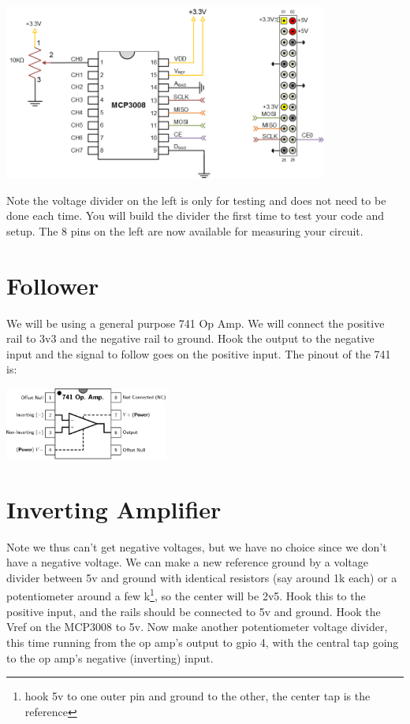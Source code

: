 \includegraphics[width=0.8\textwidth]{../images/mcp3008_circuit.png}

Note the voltage divider on the left is only for testing and does not need to be done each time.  You will build the divider the first time to test your code and setup.  The 8 pins on the left are now available for measuring your circuit.

\section{Follower}

We will be using a general purpose 741 Op Amp.  We will connect the positive rail to 3v3 and the negative rail to ground.  Hook the output to the negative input and the signal to follow goes on the positive input.  The pinout of the 741 is:

\includegraphics[width=0.4\textwidth]{../images/300px-Generic_741_pinout_top.png}


\section{Inverting Amplifier}

Note we thus can't get negative voltages, but we have no choice since we don't have a negative voltage.  We can make a new reference ground by a voltage divider between 5v and ground with identical resistors (say around 1k each) or a potentiometer around a few k\footnote{hook 5v to one outer pin and ground to the other, the center tap is the reference}, so the center will be 2v5.  Hook this to the positive input, and the rails should be connected to 5v and ground.  Hook the Vref on the MCP3008 to 5v.  Now make another potentiometer voltage divider, this time running from the op amp's output to gpio 4, with the central tap going to the op amp's negative (inverting) input.



